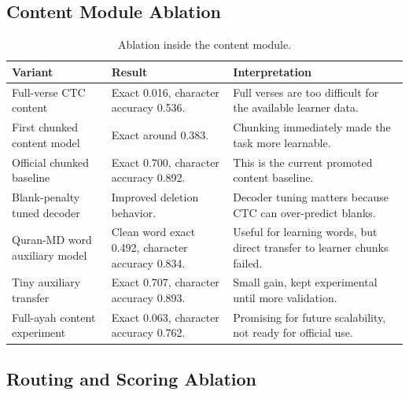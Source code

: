 \subsection{Content Module Ablation}

\begin{table}[H]
\centering
\small
\begin{tabularx}{\textwidth}{p{} p{} X}
\toprule
\textbf{Variant} & \textbf{Result} & \textbf{Interpretation} \\
\midrule
Full-verse CTC content &
Exact 0.016, character accuracy 0.536. &
Full verses are too difficult for the available learner data. \\
\midrule
First chunked content model &
Exact around 0.383. &
Chunking immediately made the task more learnable. \\
\midrule
Official chunked baseline &
Exact 0.700, character accuracy 0.892. &
This is the current promoted content baseline. \\
\midrule
Blank-penalty tuned decoder &
Improved deletion behavior. &
Decoder tuning matters because CTC can over-predict blanks. \\
\midrule
Quran-MD word auxiliary model &
Clean word exact 0.492, character accuracy 0.834. &
Useful for learning words, but direct transfer to learner chunks failed. \\
\midrule
Tiny auxiliary transfer &
Exact 0.707, character accuracy 0.893. &
Small gain, kept experimental until more validation. \\
\midrule
Full-ayah content experiment &
Exact 0.063, character accuracy 0.762. &
Promising for future scalability, not ready for official use. \\
\bottomrule
\end{tabularx}
\caption{Ablation inside the content module.}
\label{tab:content_ablation}
\end{table}

\subsection{Routing and Scoring Ablation}

